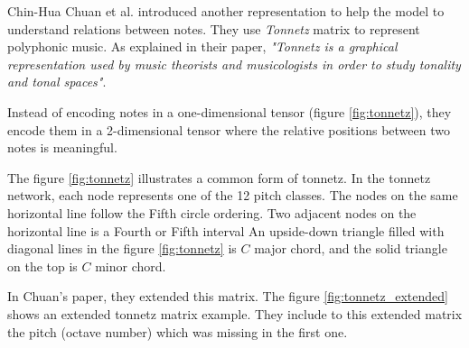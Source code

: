 \documentclass[12pt]{report}
\begin{document}
\bigskip

Chin-Hua Chuan et al. \cite{chuan_modeling_nodate} introduced another representation to help the model to understand relations between notes.
They use \textit{Tonnetz} matrix \cite{mason_essential_nodate} to represent polyphonic music.
As explained in their paper, \textit{"Tonnetz is a graphical representation used by music theorists and musicologists in order to study tonality and tonal spaces"}.

Instead of encoding notes in a one-dimensional tensor (figure \ref{fig:tonnetz}), they encode them in a 2-dimensional tensor where the relative positions between two notes is meaningful.

The figure \ref{fig:tonnetz} illustrates a common form of tonnetz.
In the tonnetz network, each node represents one of the 12 pitch classes.
The nodes on the same horizontal line follow the Fifth circle ordering. Two adjacent nodes on the horizontal line is a Fourth or Fifth interval
An upside-down triangle filled with diagonal lines in the figure \ref{fig:tonnetz} is $C$ major chord, and the solid triangle on the top is $C$ minor chord.

In Chuan's paper, they extended this matrix.
The figure \ref{fig:tonnetz_extended} shows an extended tonnetz matrix example.
They include to this extended matrix the pitch (octave number) which was missing in the first one.
\end{document}
